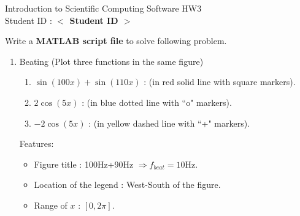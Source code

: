 \documentclass[12pt,a4paper]{article}
\newcommand{\placeholder}[1]{\textbf{$<$ #1 $>$}}
\newcommand{\idnumber}{\placeholder{Student ID}}
\begin{document}
\begin{flushleft}Introduction to Scientific Computing Software HW3
\\Student ID : \idnumber{}\end{flushleft}

Write a \textbf{MATLAB script file} to solve following problem.
\begin{enumerate}
\item Beating (Plot three functions in the same figure)
\begin{enumerate} 
\item $\sin(100x)+\sin(110x)$ : (in red solid line with square markers).

\item $2\cos(5x)$ : (in blue dotted line with ``o" markers).
\item $-2\cos(5x)$ : (in yellow dashed line with ``+" markers).
\end{enumerate}
Features:
\begin{itemize}
\item Figure title : 100Hz+90Hz $\Rightarrow f_{beat}=10$Hz.
\item Location of the legend : West-South of the figure.
\item Range of $x $ : $[0,2\pi]$.
\end{itemize}
\end{enumerate}
\end{document}
